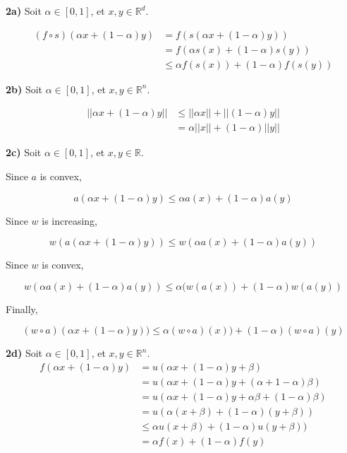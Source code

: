 \documentclass[
10pt, %
a4paper, %
oneside, %
headinclude,footinclude, %
BCOR5mm, %
]{scrartcl}
\begin{document}
\textbf{2a)} Soit $\alpha\in [0, 1]$, et $x, y\in \mathbb{R}^d$.

\begin{equation}
    \begin{aligned}
        \label{eq:}
	(f\circ s)(\alpha x+(1-\alpha)y)&= f(s(\alpha x+(1-\alpha)y))\\
	&= f(\alpha s(x)+(1-\alpha)s(y))\\
	&\leq \alpha f(s(x))+(1-\alpha)f(s(y))
    \end{aligned}
\end{equation}

\textbf{2b)} Soit $\alpha\in [0, 1]$, et $x, y\in \mathbb{R}^n$.

\begin{equation}
    \begin{aligned}
        \label{eq:}
	||\alpha x+(1-\alpha)y||&\leq ||\alpha x||+||(1-\alpha)y||\\
	&=\alpha ||x||+(1-\alpha )||y||
    \end{aligned}
\end{equation}

\textbf{2c)} Soit $\alpha\in [0, 1]$, et $x, y\in \mathbb{R}$.

Since $a$ is convex,

\begin{equation}
	 a(\alpha x+(1-\alpha)y)\leq \alpha a(x)+(1-\alpha)a(y)
\end{equation}

Since $w$ is increasing,

\begin{equation}
    w(a(\alpha x+(1-\alpha)y))\leq w(\alpha a(x)+(1-\alpha)a(y))
\end{equation}

Since $w$ is convex,

\begin{equation}
    w(\alpha a(x)+(1-\alpha)a(y))\leq \alpha(w(a(x))+(1-\alpha)w(a(y))
\end{equation}

Finally,

\begin{equation}
    (w\circ a)(\alpha x+(1-\alpha)y))\leq \alpha(w\circ a)(x))+(1-\alpha)(w\circ a)(y)
\end{equation}

\textbf{2d)} Soit $\alpha\in [0, 1]$, et $x, y\in \mathbb{R}^n$.
\begin{equation}
	\begin{aligned}
		\label{eq:}
		f(\alpha x + (1-\alpha) y) &= u(\alpha x + (1-\alpha) y + \beta)\\
		&= u(\alpha x + (1-\alpha) y + (\alpha + 1-\alpha)\beta)\\
		&= u(\alpha x + (1-\alpha) y + \alpha\beta + (1-\alpha)\beta)\\
		&= u(\alpha (x+\beta) + (1-\alpha) (y+\beta))\\
		&\leq \alpha u(x+\beta) + (1-\alpha)u(y+\beta))\\
		&= \alpha f(x) + (1-\alpha)f(y)\\
	\end{aligned}
\end{equation}
\end{document}
